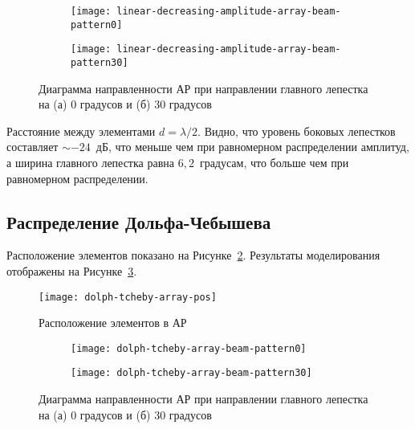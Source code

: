 \begin{figure}[!ht]
    \centering
    \begin{subfigure}[b]{0.49\textwidth}
        \centering
        \hspace*{-3ex}
        \texttt{[image: linear-decreasing-amplitude-array-beam-pattern0]}
        \caption{}%
    \end{subfigure}
    \hfill
    \begin{subfigure}[b]{0.49\textwidth}
        \centering
        \hspace*{-3ex}
        \texttt{[image: linear-decreasing-amplitude-array-beam-pattern30]}
        \caption{}%
    \end{subfigure}
    \caption{%
    Диаграмма направленности АР при направлении главного лепестка на (а) 0 градусов и (б) 30 градусов
    }%
    \label{fig:linear-decreasing-amplitude-array-modeling}
\end{figure}

Расстояние между элементами $d=\lambda/2$. Видно, что уровень боковых лепестков составляет $\sim-24$~дБ,
что меньше чем при равномерном распределении амплитуд,
а ширина главного лепестка равна $6,2$~градусам, что больше чем при равномерном распределении.

\subsection{Распределение Дольфа-Чебышева}

Расположение элементов показано на Рисунке~\ref{fig:dolph-tcheby-array-pos}. Результаты моделирования отображены на Рисунке~\ref{fig:dolph-tcheby-array-modeling}.

\begin{figure}[!ht]
    \centering
    \texttt{[image: dolph-tcheby-array-pos]}
    \caption{Расположение элементов в АР}
    \label{fig:dolph-tcheby-array-pos}
\end{figure}


\begin{figure}[!ht]
    \centering
    \begin{subfigure}[b]{0.49\textwidth}
        \centering
        \hspace*{-3ex}
        \texttt{[image: dolph-tcheby-array-beam-pattern0]}
        \caption{}%
    \end{subfigure}
    \hfill
    \begin{subfigure}[b]{0.49\textwidth}
        \centering
        \hspace*{-3ex}
        \texttt{[image: dolph-tcheby-array-beam-pattern30]}
        \caption{}%
    \end{subfigure}
    \caption{%
    Диаграмма направленности АР при направлении главного лепестка на (а) 0 градусов и (б) 30 градусов
    }%
    \label{fig:dolph-tcheby-array-modeling}
\end{figure}

